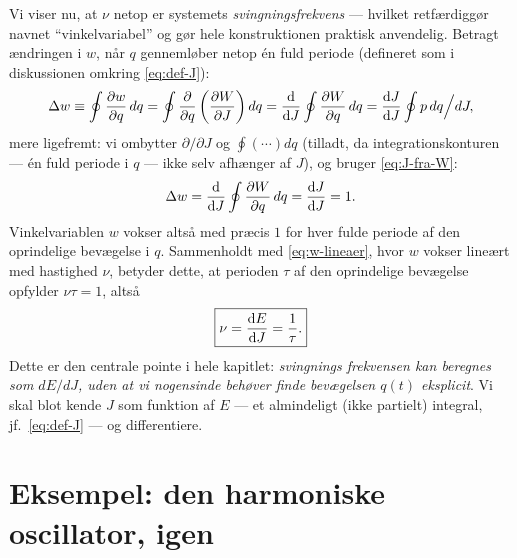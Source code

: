 Vi viser nu, at $\nu$ netop er systemets \emph{svingningsfrekvens} — hvilket
retfærdiggør navnet ``vinkelvariabel'' og gør hele konstruktionen
praktisk anvendelig. Betragt ændringen i $w$, når $q$ gennemløber netop
\'en fuld periode (defineret som i diskussionen omkring
\eqref{eq:def-J}):
\begin{equation}
  \Delta w \equiv \oint \pdv{w}{q}\,dq = \oint \pdv{}{q}\left(\pdv{W}{J}\right)dq
  = \dv{}{J}\oint \pdv{W}{q}\,dq = \dv{J}{J}\oint p\,dq\Big/ dJ,
\end{equation}
mere ligefremt: vi ombytter $\partial/\partial J$ og $\oint(\cdots)dq$
(tilladt, da integrationskonturen — én fuld periode i $q$ — ikke selv
afhænger af $J$), og bruger \eqref{eq:J-fra-W}:
\begin{equation}
  \Delta w = \dv{}{J}\oint\pdv{W}{q}\,dq = \dv{J}{J} = 1.
  \label{eq:delta-w-1}
\end{equation}
Vinkelvariablen $w$ vokser altså med præcis $1$ for hver fulde periode
af den oprindelige bevægelse i $q$. Sammenholdt med
\eqref{eq:w-lineaer}, hvor $w$ vokser lineært med hastighed $\nu$,
betyder dette, at perioden $\tau$ af den oprindelige bevægelse opfylder
$\nu\tau=1$, altså
\begin{equation}
  \boxed{\nu = \dv{E}{J} = \frac{1}{\tau}.}
  \label{eq:nu-er-frekvens}
\end{equation}
Dette er den centrale pointe i hele kapitlet: \emph{svingnings\-
frekvensen kan beregnes som $dE/dJ$, uden at vi nogensinde behøver
finde bevægelsen $q(t)$ eksplicit}. Vi skal blot kende $J$ som funktion
af $E$ — et almindeligt (ikke partielt) integral, jf.\
\eqref{eq:def-J} — og differentiere.

\section{Eksempel: den harmoniske oscillator, igen}

